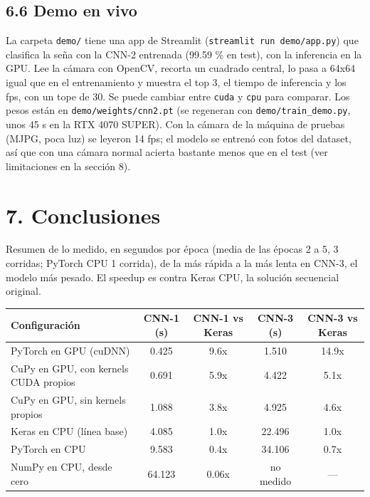 \documentclass[
  11pt,
]{article}
\begin{document}
\subsection{6.6 Demo en vivo}\label{demo}

La carpeta \texttt{demo/} tiene una app de Streamlit (\texttt{streamlit run demo/app.py}) que clasifica la seña
con la CNN-2 entrenada (99.59 \% en test), con la inferencia en la GPU. Lee la cámara con OpenCV, recorta un cuadrado
central, lo pasa a 64x64 igual que en el entrenamiento y muestra el top 3, el tiempo de inferencia y los fps, con un tope
de 30. Se puede cambiar entre \texttt{cuda} y \texttt{cpu} para comparar. Los pesos están en
\texttt{demo/weights/cnn2.pt} (se regeneran con \texttt{demo/train\_demo.py}, unos 45 s en la RTX 4070 SUPER).
Con la cámara de la máquina de pruebas (MJPG, poca luz) se leyeron 14 fps; el modelo se entrenó con fotos del dataset,
así que con una cámara normal acierta bastante menos que en el test (ver limitaciones en la sección 8).

\clearpage
\section{7. Conclusiones}\label{conclusiones}

Resumen de lo medido, en segundos por época (media de las épocas 2 a 5, 3 corridas; PyTorch CPU 1 corrida), de la más rápida a la más lenta
en CNN-3, el modelo más pesado. El speedup es contra Keras CPU, la solución secuencial original.

\begin{center}
\begin{tabular}{|l|c|c|c|c|}
\hline
Configuración & CNN-1 (s) & CNN-1 vs Keras & CNN-3 (s) & CNN-3 vs Keras \\
\hline
PyTorch en GPU (cuDNN) & 0.425 & 9.6x & 1.510 & 14.9x \\
CuPy en GPU, con kernels CUDA propios & 0.691 & 5.9x & 4.422 & 5.1x \\
CuPy en GPU, sin kernels propios & 1.088 & 3.8x & 4.925 & 4.6x \\
Keras en CPU (línea base) & 4.085 & 1.0x & 22.496 & 1.0x \\
PyTorch en CPU & 9.583 & 0.4x & 34.106 & 0.7x \\
NumPy en CPU, desde cero & 64.123 & 0.06x & no medido & --- \\
\hline
\end{tabular}
\end{center}
\end{document}

